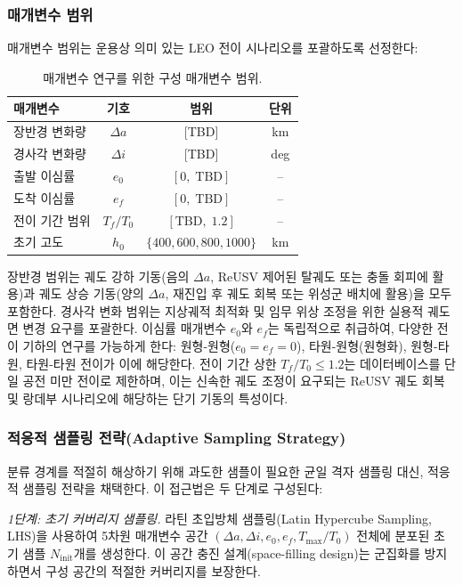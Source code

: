 \documentclass[a4paper,fleqn]{cas-dc}
\begin{document}
\subsubsection{매개변수 범위}

매개변수 범위는 운용상 의미 있는 LEO 전이 시나리오를 포괄하도록 선정한다:

\begin{table}[ht]
\centering
\caption{매개변수 연구를 위한 구성 매개변수 범위.}
\label{tab:param_ranges}
\begin{tabular}{lccc}
\hline
매개변수 & 기호 & 범위 & 단위 \\
\hline
장반경 변화량 & $\Delta a$ & [TBD] & km \\
경사각 변화량 & $\Delta i$ & [TBD] & deg \\
출발 이심률 & $e_0$ & $[0,\;\text{TBD}]$ & -- \\
도착 이심률 & $e_f$ & $[0,\;\text{TBD}]$ & -- \\
전이 기간 범위 & $T_f/T_0$ & $[\text{TBD},\; 1.2]$ & -- \\
초기 고도 & $h_0$ & $\{400, 600, 800, 1000\}$ & km \\
\hline
\end{tabular}
\end{table}

장반경 범위는 궤도 강하 기동(음의 $\Delta a$, ReUSV 제어된 탈궤도 또는 충돌 회피에 활용)과 궤도 상승 기동(양의 $\Delta a$, 재진입 후 궤도 회복 또는 위성군 배치에 활용)을 모두 포함한다. 경사각 변화 범위는 지상궤적 최적화 및 임무 위상 조정을 위한 실용적 궤도면 변경 요구를 포괄한다. 이심률 매개변수 $e_0$와 $e_f$는 독립적으로 취급하여, 다양한 전이 기하의 연구를 가능하게 한다: 원형-원형($e_0 = e_f = 0$), 타원-원형(원형화), 원형-타원, 타원-타원 전이가 이에 해당한다. 전이 기간 상한 $T_f/T_0 \leq 1.2$는 데이터베이스를 단일 공전 미만 전이로 제한하며, 이는 신속한 궤도 조정이 요구되는 ReUSV 궤도 회복 및 랑데부 시나리오에 해당하는 단기 기동의 특성이다.

\subsubsection{적응적 샘플링 전략(Adaptive Sampling Strategy)}

분류 경계를 적절히 해상하기 위해 과도한 샘플이 필요한 균일 격자 샘플링 대신, 적응적 샘플링 전략을 채택한다. 이 접근법은 두 단계로 구성된다:

\textit{1단계: 초기 커버리지 샘플링.} 라틴 초입방체 샘플링(Latin Hypercube Sampling, LHS)을 사용하여 5차원 매개변수 공간 $(\Delta a, \Delta i, e_0, e_f, T_{\max}/T_0)$ 전체에 분포된 초기 샘플 $N_{\text{init}}$개를 생성한다. 이 공간 충진 설계(space-filling design)는 군집화를 방지하면서 구성 공간의 적절한 커버리지를 보장한다.
\end{document}
